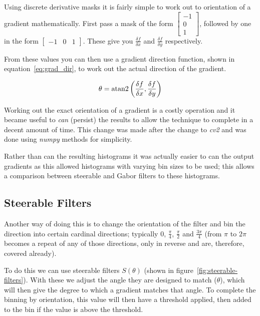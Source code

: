 Using discrete derivative masks it is fairly simple to work out to orientation of a gradient 
mathematically. First pass a mask of the form $\begin{bmatrix}-1\\0\\1\end{bmatrix}$, followed
by one in the form $\begin{bmatrix}-1 & 0 & 1\end{bmatrix}$. These give you 
$\frac{\delta f}{\delta x}$ and $\frac{\delta f}{\delta y}$ respectively.

From these values you can then use a gradient direction function, shown in 
equation~\ref{eq:grad_dir}, to work out the actual direction of the gradient.

\begin{equation} \label{eq:grad_dir}
\theta = {\rm atan2}\left( \frac{\delta f}{\delta x}, \frac{\delta f}{\delta y} \right)
\end{equation}

Working out the exact orientation of a gradient is a costly operation and it became useful to
\emph{can} (persist) the results to allow the technique to complete in a decent amount of time.
This change was made after the change to \emph{cv2} and was done using \emph{numpy} methods for
simplicity. 

Rather than can the resulting histograms it was actually easier to can the output gradients as 
this allowed histograms with varying bin sizes to be used; this allows a comparison between 
steerable and Gabor filters to these histograms.

\subsection{Steerable Filters}
Another way of doing this is to change the orientation of the filter and bin the direction into 
certain cardinal directions; typically $0$, $\frac{\pi}{4}$, $\frac{\pi}{2}$ and $\frac{3\pi}{4}$
(from $\pi$ to $2\pi$ becomes a repeat of any of those directions, only in reverse and are, 
therefore, covered already).

To do this we can use steerable filters $S(\theta)$ (shown in figure~\ref{fig:steerable-filters}). 
With these we adjust the angle they are designed to match ($\theta$), which will then give the 
degree to which a gradient matches that angle. To complete the binning by orientation, this value 
will then have a threshold applied, then added to the bin if the value is above the threshold.

